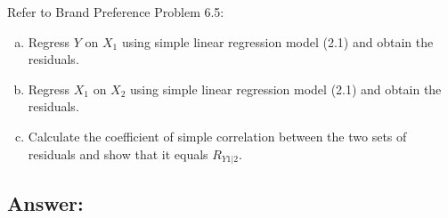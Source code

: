 \documentclass{article}
\begin{document}
Refer to Brand Preference Problem 6.5:

\begin{enumerate}[a)]
\item{} Regress $Y$ on $X_1$ using simple linear regression model (2.1) and obtain the residuals.
\item{} Regress $X_1$ on $X_2$ using simple linear regression model (2.1) and obtain the residuals.
\item{} Calculate the coefficient of simple correlation between the two sets of residuals and show that it equals $R_{Y1|2}$.
\end{enumerate}

\subsection{Answer:}
\end{document}
